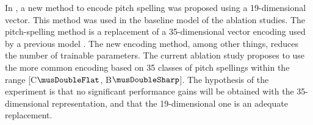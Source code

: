 
In , a new method to encode
pitch spelling was proposed using a 19-dimensional vector.
This method was used in the baseline model of the ablation
studies. The pitch-spelling method is a replacement of a
35-dimensional vector encoding used by a previous model
\parencite{micchi2021deep}. The new encoding method, among
other things, reduces the number of trainable parameters.
The current ablation study proposes to use the more common
encoding based on 35 classes of pitch spellings within the
range [C$\musDoubleFlat$, B$\musDoubleSharp$]. The
hypothesis of the experiment is that no significant
performance gains will be obtained with the 35-dimensional
representation, and that the 19-dimensional one is an
adequate replacement.
